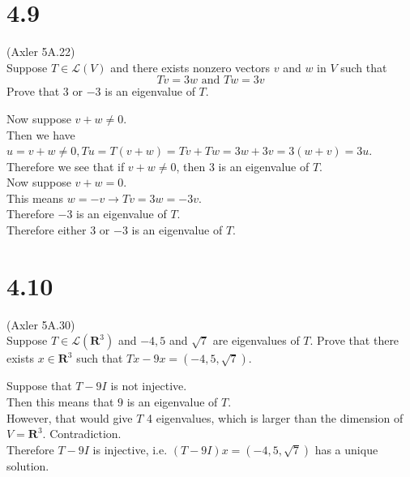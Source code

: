 \documentclass{article}
\begin{document}
\section*{4.9}
(Axler 5A.22)\\
Suppose $T \in \mathcal{L}(V)$ and there exists nonzero vectors $v$ and $w$ in $V$ such that
\begin{equation*}
    Tv = 3w \textrm{   and   } Tw = 3v
\end{equation*}
Prove that $3$ or $-3$ is an eigenvalue of $T$.
\begin{addmargin}[1em]{0em}
    Now suppose $v+w \neq 0$.\\
    Then we have $u = v+w \neq 0, Tu = T(v+w) = Tv + Tw = 3w + 3v = 3(w+v) = 3u$.\\
    Therefore we see that if $v+w \neq 0$, then $3$ is an eigenvalue of $T$.\\
    Now suppose $v+w = 0$.\\
    This means $w = -v \rightarrow Tv = 3w = -3v$.\\
    Therefore $-3$ is an eigenvalue of $T$.\\
    Therefore either $3$ or $-3$ is an eigenvalue of $T$.
\end{addmargin}
\section*{4.10}
(Axler 5A.30)\\
Suppose $T \in \mathcal{L}(\mathbf{R}^3)$ and $-4, 5$ and $\sqrt{7}$ are eigenvalues of $T$. Prove that there exists $x \in \mathbf{R}^3$ such that $Tx - 9x = (-4, 5, \sqrt{7})$.
\begin{addmargin}[1em]{0em}
    Suppose that $T-9I$ is not injective.\\
    Then this means that $9$ is an eigenvalue of $T$.\\
    However, that would give $T$ 4 eigenvalues, which is larger than the dimension of $V = \mathbf{R}^3$. Contradiction.\\
    Therefore $T-9I$ is injective, i.e. $(T-9I)x = (-4, 5, \sqrt{7})$ has a unique solution.
\end{addmargin}
\end{document}
